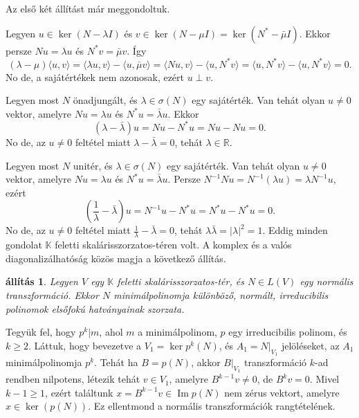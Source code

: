 \documentclass[a4paper, showtrims]{memoir}
\makeatletter
\renewenvironment{proof}[1][\proofname]
    {\par\pushQED{\qed}%
    \normalfont \topsep6\p@\@plus6\p@\relax
    \trivlist
    \item[\hskip\labelsep
        \itshape
    #1\@addpunct{:}]\ignorespaces}
    {\popQED\endtrivlist\@endpefalse}
\theoremstyle{plain}
\newtheorem{proposition}{állítás}[chapter]
\theoremstyle{remark}
\theoremstyle{definition}
\DeclareMathOperator{\im}{Im}
\newcommand{\ip}[2]{\langle#1,#2\rangle}
\makeatother
\begin{document}
\begin{proof}
	Az első két állítást már meggondoltuk.

	Legyen
	\begin{math}
		u\in\ker\left( N-\lambda I \right)
	\end{math}
	és
	\begin{math}
        v\in\ker\left( N-\mu I \right)=\ker\left( N^\ast-\bar{\mu}I \right)
	\end{math}.
	Ekkor persze
	\begin{math}
		Nu=\lambda u
	\end{math}
	és
	\begin{math}
		N^\ast v=\bar{\mu}v
	\end{math}.
	Így
	\[
		\left( \lambda-\mu \right)\ip{u}{v}
		=
		\ip{\lambda u}{v}-\ip{u}{\bar{\mu}v}
		=
		\ip{Nu}{v}-\ip{u}{N^\ast v}
		=
		\ip{u}{N^\ast v}-\ip{u}{N^\ast v}
		=
		0.
	\]
	No de, a sajátértékek nem azonosak,
	ezért $u\perp v$.

	Legyen most $N$ önadjungált, és $\lambda\in\sigma\left( N \right)$ egy sajátérték.
	Van tehát olyan $u\neq 0$ vektor, amelyre $Nu=\lambda u$ és $N^\ast u=\bar{\lambda}u$.
	Ekkor
	\[
		\left( \lambda-\bar{\lambda} \right)u
		=Nu-N^\ast u=Nu-Nu=0.
	\]
	No de, az $u\neq 0$ feltétel miatt $\lambda-\bar{\lambda}=0$, tehát $\lambda\in\mathbb{R}.$


	Legyen most $N$ unitér, és $\lambda\in\sigma\left( N \right)$ egy sajátérték.
	Van tehát olyan $u\neq 0$ vektor, amelyre $Nu=\lambda u$ és $N^\ast u=\bar{\lambda}u$.
    Persze $N^{-1}Nu=N^{-1}\left( \lambda u \right)=\lambda N^{-1}u$,
	ezért
	\[
        \left( \frac{1}{\lambda}-\bar{\lambda} \right)u
        =N^{-1}u-N^\ast u=N^\ast u - N^\ast u=0.
	\]
    No de, az $u\neq 0$ feltétel miatt $\frac{1}{\lambda}-\bar{\lambda}=0$, tehát $\lambda\bar{\lambda}=|\lambda|^2=1$.
\end{proof}
Eddig minden gondolat $\mathbb{K}$ feletti skalárisszorzatos-téren volt.
A komplex és a valós diagonalizálhatóság közös magja a következő állítás.
\begin{proposition}\label{pr:normalis-mult1}
	Legyen $V$ egy $\mathbb{K}$ feletti skalárisszorzatos-tér,
	és $N\in L\left( V \right)$ egy normális transzformáció.
	Ekkor $N$ minimálpolinomja különböző, normált, irreducibilis polinomok elsőfokú hatványainak szorzata.
\end{proposition}
\begin{proof}
	Tegyük fel, hogy $p^k|m$, ahol $m$ a minimálpolinom,
	$p$ egy irreducibilis polinom, és $k\geq 2.$
	Láttuk, hogy bevezetve a $V_1=\ker p^k\left( N \right)$, és
	$A_1=N|_{V_1}$ jelöléseket,
	az $A_1$ minimálpolinomja $p^k$.
	Tehát ha $B=p(N)$, akkor $B|_{V_1}$ transzformáció $k$-ad rendben nilpotens,
	létezik tehát $v\in V_1$,
	amelyre $B^{k-1}v\neq 0$,
	de $B^kv=0$.
	Mivel $k-1\geq 1$, ezért találtunk $x=B^{k-1}v\in\im p\left( N \right)$
	nem zérus vektort,
	amelyre $x\in\ker(p\left( N \right))$.
	Ez ellentmond a normális transzformációk rangtételének.
\end{proof}
\end{document}
